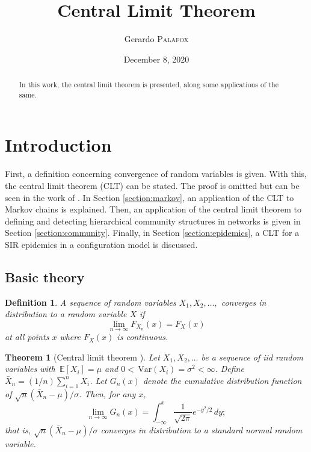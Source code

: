 \documentclass[letterpaper, 10 pt, conference]{article}
\title{Central Limit Theorem
}
\date{December 8, 2020}
\author{Gerardo {\textsc{Palafox}}}
\newtheorem{thm}{Theorem}
\newtheorem{defn}{Definition}
\newcommand\var[1]{\, \mathrm{Var} \left( #1 \right)}
\newcommand\expec[1]{\, \mathbb{E} \left\lbrack #1 \right\rbrack}
\begin{document}
\maketitle
\begin{abstract}
	In this work, the central limit theorem is presented, along some applications of the same.
\end{abstract}
\section{Introduction}
First, a definition concerning convergence of random variables is given. With this, the central limit theorem (CLT) can be stated. The proof is omitted but can be seen in the work of \cite{Casella_Berger_2002}. In Section \ref{section:markov}, an application of the  CLT to Markov chains is explained. Then, an application of the central limit theorem to defining and detecting hierarchical community structures in networks is given in Section \ref{section:community}. Finally, in Section \ref{section:epidemics}, a CLT for a SIR epidemics in a configuration model is discussed.

\subsection{Basic theory}

\begin{defn}
	A sequence of random variables $X_1, X_2, \dots,$ converges in distribution to a random variable $X$ if 
	\begin{equation}
		\lim_{n \rightarrow \infty} F_{X_n} (x) = F_X (x)
	\end{equation}
	at all points $x$ where $F_{X} (x)$ is continuous.
\end{defn} 

\begin{thm}[Central limit theorem \citep{Casella_Berger_2002}]
Let $X_1, X_2, \dots$ be a sequence of iid random variables with $\expec{X_i}  = \mu$ and $0 < \var{X_i} = \sigma^2 < \infty$. Define $\bar{X}_n = (1/n) \sum_{i = 1}^{n} X_i$. Let $G_n (x)$ denote the cumulative distribution function of $\sqrt{n} (\bar{X}_n - \mu)/\sigma$. Then, for any $x$,
\begin{equation}
	\lim_{n \rightarrow \infty} G_n (x) = \int_{-\infty}^{x} \frac{1}{\sqrt{2 \pi}} e^{-y^2 / 2} \, dy ;
\end{equation}
that is, $\sqrt{n} (\bar{X}_n - \mu)/\sigma$ converges in distribution to a standard normal random variable.
\end{thm}
\end{document}

